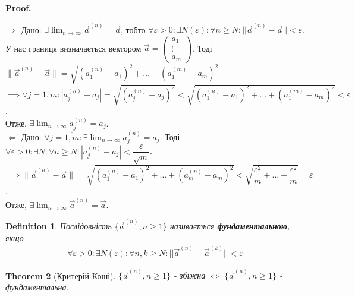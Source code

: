 \documentclass[a4paper, 10pt]{article}
\makeatletter
\def\huge{\displaystyle}
\def\qed{$\blacksquare$}
\def\rightproof{$\boxed{\Rightarrow}$ }
\def\leftproof{$\boxed{\Leftarrow}$ }
\theoremstyle{theoremdd}
\newtheorem{theorem}{Theorem}[subsection]
\theoremstyle{theoremdd}
\newtheorem{definition}[theorem]{Definition}
\theoremstyle{theoremdd}
\theoremstyle{theoremdd}
\theoremstyle{theoremdd}
\theoremstyle{theoremdd}
\theoremstyle{theoremdd}
\theoremstyle{theoremdd}
\renewenvironment{proof}[1][Proof.\\]{\par
\pushQED{\hfill \qed}%
\normalfont \topsep6\p@\@plus6\p@\relax
\trivlist
\item\relax
{\bfseries
#1\@addpunct{.}}\hspace\labelsep\ignorespaces
}{%
\popQED\endtrivlist\@endpefalse
}
\newcommand\Norm[1]{\lVert#1\rVert}
\makeatother
\begin{document}
\begin{proof}
\rightproof Дано: $\exists \huge \lim_{n \to \infty} \vec{a}^{(n)} = \vec{a}$, тобто $\huge \forall \varepsilon > 0: \exists N(\varepsilon): \forall n \geq N: ||\vec{a}^{(n)} - \vec{a}|| < \varepsilon$.\\
У нас границя визначається вектором $\vec{a} = \begin{pmatrix}
a_1 \\ \vdots \\ a_m
\end{pmatrix}$. Тоді 
$\Norm{\vec{a}^{(n)} - \vec{a}} = \sqrt{(a_1^{(n)} - a_1)^2 + \dots + (a_1^{(m)} - a_m)^2}$\\
$\implies \forall j = \overline{1,m}: |a_j^{(n)} - a_j| = \sqrt{(a_j^{(n)} - a_j)^2} < \sqrt{(a_1^{(n)} - a_1)^2 + \dots + (a_1^{(m)} - a_m)^2} < \varepsilon$.\\
Отже, $\exists \huge \lim_{n \to \infty} a_j^{(n)} = a_j$.
\bigskip \\
\leftproof Дано: $\forall j = \overline{1,m}: \exists \huge \lim_{n \to \infty} a_j^{(n)} = a_j$. Тоді $\forall \varepsilon > 0: \exists N: \forall n \geq N: |a_j^{(n)} - a_j| < \dfrac{\varepsilon}{\sqrt{m}}$.\\
$\implies \Norm{\vec{a}^{(n)} - \vec{a}} = \sqrt{(a_1^{(n)} - a_1)^2 + \dots + (a_m^{(n)} - a_m)^2} < \sqrt{\dfrac{\varepsilon^2}{m} + \dots + \dfrac{\varepsilon^2}{m}} = \varepsilon$.\\
Отже, $\exists \huge \lim_{n \to \infty} \vec{a}^{(n)} = \vec{a}$.
\end{proof}

\begin{definition}
Послідовність $\{\vec{a}^{(n)}, n \geq 1 \}$ називається \textbf{фундаментальною}, якщо
\begin{align*}
\forall \varepsilon > 0: \exists N(\varepsilon): \forall n, k \geq N: ||\vec{a}^{(n)} - \vec{a}^{(k)}|| < \varepsilon
\end{align*}
\end{definition}

\begin{theorem}[Критерій Коші]
$\{\vec{a}^{(n)}, n \geq 1 \}$ - збіжна $\iff$ $\{\vec{a}^{(n)}, n \geq 1 \}$ - фундаментальна.
\end{theorem}
\end{document}
